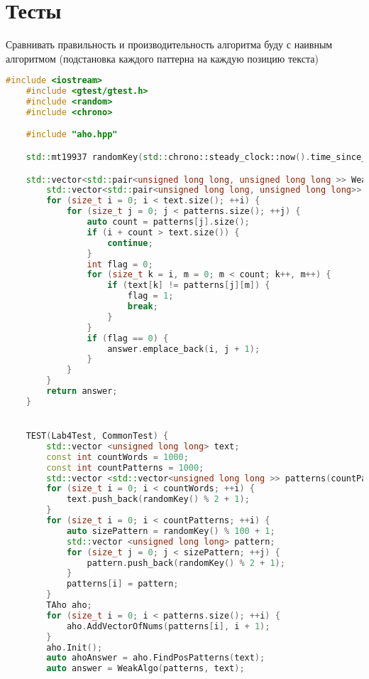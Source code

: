 \section{Тесты}


Сравнивать правильность и производительность алгоритма буду с наивным алгоритмом
(подстановка каждого паттерна на каждую позицию текста)


\begin{lstlisting}[language=C++]
    #include <iostream>
    #include <gtest/gtest.h>
    #include <random>
    #include <chrono>

    #include "aho.hpp"

    std::mt19937 randomKey(std::chrono::steady_clock::now().time_since_epoch().count());

    std::vector<std::pair<unsigned long long, unsigned long long >> WeakAlgo(std::vector<std::vector<unsigned long long>>& patterns, std::vector<unsigned long long>& text) {
        std::vector<std::pair<unsigned long long, unsigned long long>> answer;
        for (size_t i = 0; i < text.size(); ++i) {
            for (size_t j = 0; j < patterns.size(); ++j) {
                auto count = patterns[j].size();
                if (i + count > text.size()) {
                    continue;
                }
                int flag = 0;
                for (size_t k = i, m = 0; m < count; k++, m++) {
                    if (text[k] != patterns[j][m]) {
                        flag = 1;
                        break;
                    }
                }
                if (flag == 0) {
                    answer.emplace_back(i, j + 1);
                }
            }
        }
        return answer;
    }


    TEST(Lab4Test, CommonTest) {
        std::vector <unsigned long long> text;
        const int countWords = 1000;
        const int countPatterns = 1000;
        std::vector <std::vector<unsigned long long >> patterns(countPatterns);
        for (size_t i = 0; i < countWords; ++i) {
            text.push_back(randomKey() % 2 + 1);
        }
        for (size_t i = 0; i < countPatterns; ++i) {
            auto sizePattern = randomKey() % 100 + 1;
            std::vector <unsigned long long> pattern;
            for (size_t j = 0; j < sizePattern; ++j) {
                pattern.push_back(randomKey() % 2 + 1);
            }
            patterns[i] = pattern;
        }
        TAho aho;
        for (size_t i = 0; i < patterns.size(); ++i) {
            aho.AddVectorOfNums(patterns[i], i + 1);
        }
        aho.Init();
        auto ahoAnswer = aho.FindPosPatterns(text);
        auto answer = WeakAlgo(patterns, text);


\end{lstlisting}
